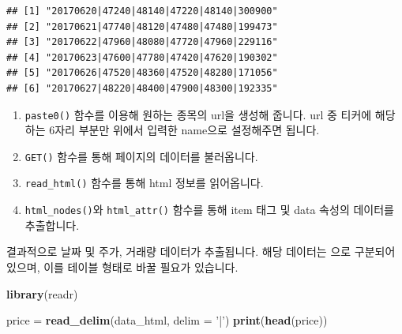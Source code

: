 \documentclass[12pt,]{book}
\newenvironment{Shaded}{\begin{snugshade}}{\end{snugshade}}
\newcommand{\DataTypeTok}[1]{\textcolor[rgb]{0.13,0.29,0.53}{#1}}
\newcommand{\KeywordTok}[1]{\textcolor[rgb]{0.13,0.29,0.53}{\textbf{#1}}}
\newcommand{\NormalTok}[1]{#1}
\newcommand{\OperatorTok}[1]{\textcolor[rgb]{0.81,0.36,0.00}{\textbf{#1}}}
\newcommand{\StringTok}[1]{\textcolor[rgb]{0.31,0.60,0.02}{#1}}
\providecommand{\tightlist}{%
  \setlength{\itemsep}{0pt}\setlength{\parskip}{0pt}}
\begin{document}
\begin{Shaded}
\end{Shaded}

\begin{verbatim}
## [1] "20170620|47240|48140|47220|48140|300900"
## [2] "20170621|47740|48120|47480|47480|199473"
## [3] "20170622|47960|48080|47720|47960|229116"
## [4] "20170623|47600|47780|47420|47620|190302"
## [5] "20170626|47520|48360|47520|48280|171056"
## [6] "20170627|48220|48400|47900|48300|192335"
\end{verbatim}

\begin{enumerate}
\def\labelenumi{\arabic{enumi}.}
\tightlist
\item
  \texttt{paste0()} 함수를 이용해 원하는 종목의 url을 생성해 줍니다. url 중 티커에 해당하는 6자리 부분만 위에서 입력한 name으로 설정해주면 됩니다.
\item
  \texttt{GET()} 함수를 통해 페이지의 데이터를 불러옵니다.
\item
  \texttt{read\_html()} 함수를 통해 html 정보를 읽어옵니다.
\item
  \texttt{html\_nodes()}와 \texttt{html\_attr()} 함수를 통해 item 태그 및 data 속성의 데이터를 추출합니다.
\end{enumerate}

결과적으로 날짜 및 주가, 거래량 데이터가 추출됩니다. 해당 데이터는 \textbf{\textbar{}}으로 구분되어 있으며, 이를 테이블 형태로 바꿀 필요가 있습니다.

\begin{Shaded}
\begin{Highlighting}[]
\KeywordTok{library}\NormalTok{(readr)}

\NormalTok{price =}\StringTok{ }\KeywordTok{read_delim}\NormalTok{(data_html, }\DataTypeTok{delim =} \StringTok{'|'}\NormalTok{)}
\KeywordTok{print}\NormalTok{(}\KeywordTok{head}\NormalTok{(price))}
\end{Highlighting}
\end{Shaded}
\end{document}
